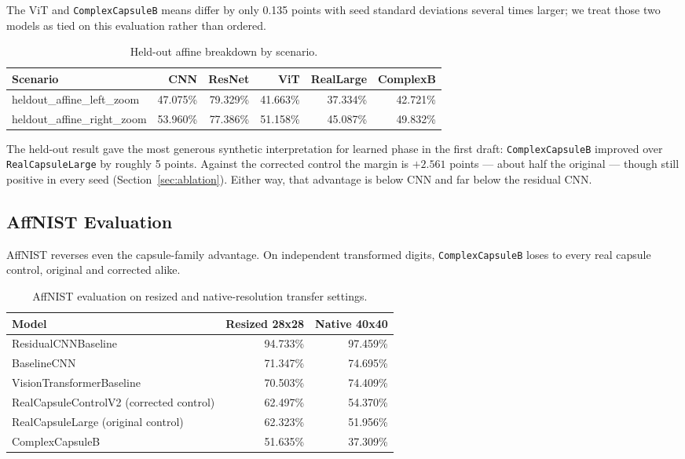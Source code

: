 \documentclass[11pt]{article}
\begin{document}
The ViT and \texttt{ComplexCapsuleB} means differ by only 0.135 points with seed standard deviations several times larger; we treat those two models as tied on this evaluation rather than ordered.

\begin{table}[t]
\centering
\small
\begin{tabular}{lrrrrr}
\toprule
Scenario & CNN & ResNet & ViT & RealLarge & ComplexB \\
\midrule
heldout\_affine\_left\_zoom & 47.075\% & 79.329\% & 41.663\% & 37.334\% & 42.721\% \\
heldout\_affine\_right\_zoom & 53.960\% & 77.386\% & 51.158\% & 45.087\% & 49.832\% \\
\bottomrule
\end{tabular}
\caption{Held-out affine breakdown by scenario.}
\label{tab:heldout-breakdown}
\end{table}

The held-out result gave the most generous synthetic interpretation for learned phase in the first draft: \texttt{ComplexCapsuleB} improved over \texttt{RealCapsuleLarge} by roughly 5 points. Against the corrected control the margin is $+2.561$ points --- about half the original --- though still positive in every seed (Section~\ref{sec:ablation}). Either way, that advantage is below CNN and far below the residual CNN.

\subsection{AffNIST Evaluation}
AffNIST reverses even the capsule-family advantage. On independent transformed digits, \texttt{ComplexCapsuleB} loses to every real capsule control, original and corrected alike.

\begin{table}[t]
\centering
\small
\begin{tabular}{lrr}
\toprule
Model & Resized 28x28 & Native 40x40 \\
\midrule
ResidualCNNBaseline & 94.733\% & 97.459\% \\
BaselineCNN & 71.347\% & 74.695\% \\
VisionTransformerBaseline & 70.503\% & 74.409\% \\
RealCapsuleControlV2 (corrected control) & 62.497\% & 54.370\% \\
RealCapsuleLarge (original control) & 62.323\% & 51.956\% \\
ComplexCapsuleB & 51.635\% & 37.309\% \\
\bottomrule
\end{tabular}
\caption{AffNIST evaluation on resized and native-resolution transfer settings.}
\label{tab:affnist}
\end{table}
\end{document}
